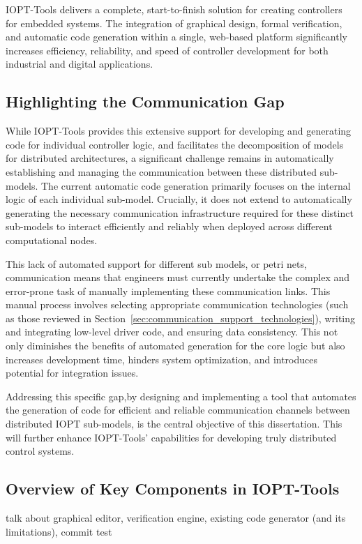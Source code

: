 IOPT-Tools delivers a complete, start-to-finish solution for creating controllers for embedded systems. The integration of graphical design, formal verification, and automatic code generation within a single, web-based platform significantly increases efficiency, reliability, and speed of controller development for both industrial and digital applications.


\subsection{Highlighting the Communication Gap}
\label{subsec:communication_gap}

While IOPT-Tools provides this extensive support for developing and generating code for individual controller logic, and facilitates the decomposition of models for distributed architectures, a significant challenge remains in automatically establishing and managing the communication between these distributed sub-models. The current automatic code generation primarily focuses on the internal logic of each individual sub-model. Crucially, it does not extend to automatically generating the necessary communication infrastructure required for these distinct sub-models to interact efficiently and reliably when deployed across different computational nodes.

This lack of automated support for different sub models, or petri nets, communication means that engineers must currently undertake the complex and error-prone task of manually implementing these communication links. This manual process involves selecting appropriate communication technologies (such as those reviewed in Section~\ref{sec:communication_support_technologies}), writing and integrating low-level driver code, and ensuring data consistency. This not only diminishes the benefits of automated generation for the core logic but also increases development time, hinders system optimization, and introduces potential for integration issues.

Addressing this specific gap,by designing and implementing a tool that automates the generation of code for efficient and reliable communication channels between distributed IOPT sub-models, is the central objective of this dissertation. This will further enhance IOPT-Tools' capabilities for developing truly distributed control systems.


\subsection{Overview of Key Components in IOPT-Tools}
\label{sub:iopt_tools_components}

talk about graphical editor, verification engine, existing code generator (and its limitations), commit test 






